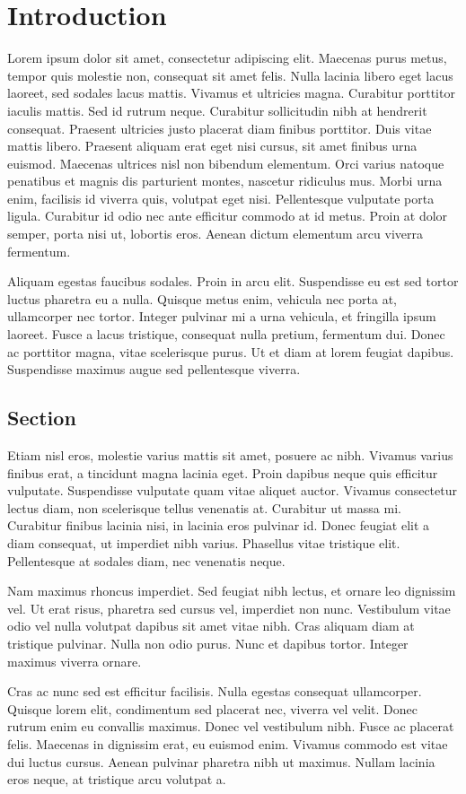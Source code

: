 \chapter{Introduction}
\label{ch:intro}

Lorem ipsum dolor sit amet, consectetur adipiscing elit. Maecenas purus metus, tempor quis molestie non, consequat sit amet felis. Nulla lacinia libero eget lacus laoreet, sed sodales lacus mattis. Vivamus et ultricies magna. Curabitur porttitor iaculis mattis. Sed id rutrum neque. Curabitur sollicitudin nibh at hendrerit consequat. Praesent ultricies justo placerat diam finibus porttitor. Duis vitae mattis libero. Praesent aliquam erat eget nisi cursus, sit amet finibus urna euismod. Maecenas ultrices nisl non bibendum elementum. Orci varius natoque penatibus et magnis dis parturient montes, nascetur ridiculus mus. Morbi urna enim, facilisis id viverra quis, volutpat eget nisi. Pellentesque vulputate porta ligula. Curabitur id odio nec ante efficitur commodo at id metus. Proin at dolor semper, porta nisi ut, lobortis eros. Aenean dictum elementum arcu viverra fermentum.

Aliquam egestas faucibus sodales. Proin in arcu elit. Suspendisse eu est sed tortor luctus pharetra eu a nulla. Quisque metus enim, vehicula nec porta at, ullamcorper nec tortor. Integer pulvinar mi a urna vehicula, et fringilla ipsum laoreet. Fusce a lacus tristique, consequat nulla pretium, fermentum dui. Donec ac porttitor magna, vitae scelerisque purus. Ut et diam at lorem feugiat dapibus. Suspendisse maximus augue sed pellentesque viverra.



\section*{Section}
\label{sec:intro:sec1}

Etiam nisl eros, molestie varius mattis sit amet, posuere ac nibh. Vivamus varius finibus erat, a tincidunt magna lacinia eget. Proin dapibus neque quis efficitur vulputate. Suspendisse vulputate quam vitae aliquet auctor. Vivamus consectetur lectus diam, non scelerisque tellus venenatis at. Curabitur ut massa mi. Curabitur finibus lacinia nisi, in lacinia eros pulvinar id. Donec feugiat elit a diam consequat, ut imperdiet nibh varius. Phasellus vitae tristique elit. Pellentesque at sodales diam, nec venenatis neque.

Nam maximus rhoncus imperdiet. Sed feugiat nibh lectus, et ornare leo dignissim vel. Ut erat risus, pharetra sed cursus vel, imperdiet non nunc. Vestibulum vitae odio vel nulla volutpat dapibus sit amet vitae nibh. Cras aliquam diam at tristique pulvinar. Nulla non odio purus. Nunc et dapibus tortor. Integer maximus viverra ornare.

Cras ac nunc sed est efficitur facilisis. Nulla egestas consequat ullamcorper. Quisque lorem elit, condimentum sed placerat nec, viverra vel velit. Donec rutrum enim eu convallis maximus. Donec vel vestibulum nibh. Fusce ac placerat felis. Maecenas in dignissim erat, eu euismod enim. Vivamus commodo est vitae dui luctus cursus. Aenean pulvinar pharetra nibh ut maximus. Nullam lacinia eros neque, at tristique arcu volutpat a.
